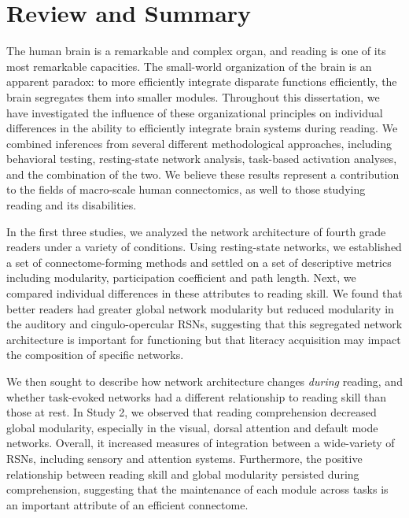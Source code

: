\chapter{Review and Summary}

The human brain is a remarkable and complex organ, and reading is one of its most remarkable capacities. The small-world organization of the brain is an apparent paradox: to more efficiently integrate disparate functions efficiently, the brain segregates them into smaller modules. Throughout this dissertation, we have investigated the influence of these organizational principles on individual differences in the ability to efficiently integrate brain systems during reading. We combined inferences from several different methodological approaches, including behavioral testing, resting-state network analysis, task-based activation analyses, and the combination of the two. We believe these results represent a contribution to the fields of macro-scale human connectomics, as well to those studying reading and its disabilities.

In the first three studies, we analyzed the network architecture of fourth grade readers under a variety of conditions. Using resting-state networks, we established a set of connectome-forming methods and settled on a set of descriptive metrics including modularity, participation coefficient and path length. Next, we compared individual differences in these attributes to reading skill. We found that better readers had greater global network modularity but reduced modularity in the auditory and cingulo-opercular RSNs, suggesting that this segregated network architecture is important for functioning but that literacy acquisition may impact the composition of specific networks. 

We then sought to describe how network architecture changes \textit{during} reading, and whether task-evoked networks had a different relationship to reading skill than those at rest. In Study 2, we observed that reading comprehension decreased global modularity, especially in the visual, dorsal attention and default mode networks. Overall, it increased measures of integration between a wide-variety of RSNs, including sensory and attention systems. Furthermore, the positive relationship between reading skill and global modularity persisted during comprehension, suggesting that the maintenance of each module across tasks is an important attribute of an efficient connectome. 

